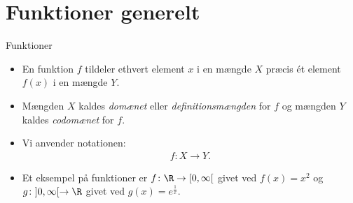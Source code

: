 \section{Funktioner generelt}
\begin{frame}{Funktioner}
\begin{itemize} 
	\setlength\itemsep{1em}
	\item<1-> En funktion $f$ tildeler ethvert element $x$ i en mængde $X$ præcis ét element $ f(x) $ i en mængde $Y$.
	\item<2-> Mængden $X$ kaldes \emph{domænet} eller \emph{definitionsmængden} for $f$ og mængden $Y$ kaldes \emph{codomænet} for $f$.
	\item<3-> Vi anvender notationen:
	\begin{align*}
	f\colon X\to Y.
	\end{align*}
	\item<4-> Et eksempel på funktioner er $f\colon \R \to [0,\infty[$ givet ved $f(x)=x^2$ og $g\colon ]0,\infty[\to \R$ givet ved $g(x)=e^{\frac{1}{x}}$.
\end{itemize}
\end{frame}

